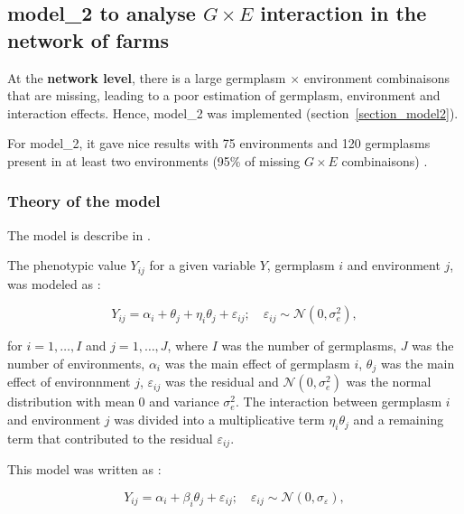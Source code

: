 \documentclass{book}\usepackage[]{graphicx}\usepackage[]{color}
\begin{document}
\newpage


\subsection{model\_2 to analyse $G \times E$ interaction in the network of farms }
\label{model_2}

At the \textbf{network level}, there is a large germplasm $\times$ environment combinaisons that are missing, leading to a poor estimation of germplasm, environment and interaction effects.
Hence, model\_2 was implemented (section~\ref{section_model2}).

For model\_2, it gave nice results with 75 environments and 120 germplasms present in at least two environments (95\% of missing $G \times E$ combinaisons) \citep{riviere_hierarchical_2016}.


\subsubsection{Theory of the model}
The model is describe in \citet{riviere_hierarchical_2016}.

The phenotypic value $Y_{ij}$ for a given variable $Y$, germplasm $i$ and environment $j$, was modeled as :

\begin{displaymath}
Y_{ij} = \alpha_{i} + \theta_{j} + \eta_{i}\theta_{j} + \varepsilon_{ij} ; \quad \varepsilon_{ij} \sim \mathcal{N} (0,\sigma^2_{e}),
\label{modele_gxe}
\end{displaymath}

for $i = 1,\ldots, I$ and $j = 1,\ldots, J$, where 
$I$ was the number of germplasms, 
$J$ was the number of environments,
$\alpha_{i}$ was the main effect of germplasm $i$,
$\theta_{j}$ was the main effect of environnment $j$,
$\varepsilon_{ij}$ was the residual and 
$\mathcal{N} (0,\sigma^2_{e})$ was the normal distribution with mean 0 and variance $\sigma^2_{e}$.
The interaction between germplasm $i$ and environment $j$ was divided into a multiplicative term $\eta_{i}\theta_{j}$ and a remaining term that contributed to the residual $\varepsilon_{ij}$.

This model was written as :

\begin{equation}
Y_{ij}  = \alpha_{i} + \beta_{i} \theta_{j} + \varepsilon_{ij}; \quad \varepsilon_{ij} \sim \mathcal{N} (0,\sigma_{\varepsilon}),
	\label{model2}
\end{equation}
\end{document}
